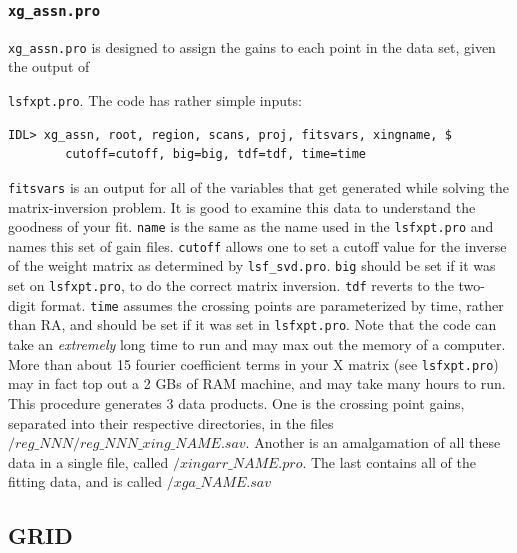 \documentclass[11pt]{article}
\begin{document}
\subsubsection{\texttt{xg\_assn.pro}}
\texttt{xg\_assn.pro} is designed to assign the gains to each point in the data set, given the output of {\texttt{lsfxpt.pro}. The code has rather simple inputs:
\begin{verbatim}
IDL> xg_assn, root, region, scans, proj, fitsvars, xingname, $
        cutoff=cutoff, big=big, tdf=tdf, time=time
\end{verbatim}
\texttt{fitsvars} is an output for all of the variables that get generated while solving the matrix-inversion problem. It is good to examine this data to understand the goodness of your fit. \texttt{name} is the same as the name used in the \texttt{lsfxpt.pro} and names this set of gain files. \texttt{cutoff} allows one to set a cutoff value for the inverse of the weight matrix as determined by \texttt{lsf\_svd.pro}. \texttt{big} should be set if it was set on \texttt{lsfxpt.pro}, to do the correct matrix inversion. \texttt{tdf} reverts to the two-digit format. \texttt{time} assumes the crossing points are parameterized by time, rather than RA, and should be set if it was set in \texttt{lsfxpt.pro}. Note that the code can take an {\it extremely} long time to run and may max out the memory of a computer. More than about 15 fourier coefficient terms in your X matrix (see \texttt{lsfxpt.pro}) may in fact top out a 2 GBs of RAM machine, and may take many hours to run. This procedure generates 3 data products. One is the crossing point gains, separated into their respective directories, in the files $/reg\_NNN/reg\_NNN\_xing\_NAME.sav$. Another is an amalgamation of all these data in a single file, called $/xingarr\_NAME.pro$. The last contains all of the fitting data, and is called $/xga\_NAME.sav$

\subsection{GRID}

}
\end{document}
